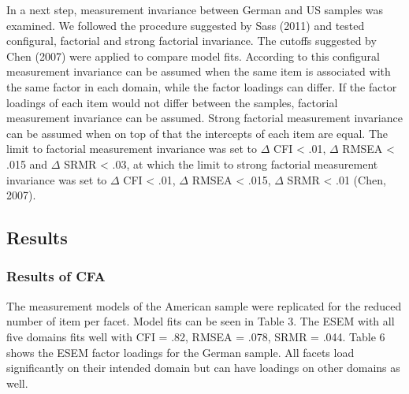 \documentclass[man]{apa6}
\theoremstyle{definition}
\theoremstyle{definition}
\theoremstyle{definition}
\theoremstyle{remark}
\begin{document}
In a next step, measurement invariance between German and US samples was
examined. We followed the procedure suggested by Sass (2011) and tested
configural, factorial and strong factorial invariance. The cutoffs
suggested by Chen (2007) were applied to compare model fits. According
to this configural measurement invariance can be assumed when the same
item is associated with the same factor in each domain, while the factor
loadings can differ. If the factor loadings of each item would not
differ between the samples, factorial measurement invariance can be
assumed. Strong factorial measurement invariance can be assumed when on
top of that the intercepts of each item are equal. The limit to
factorial measurement invariance was set to \(\Delta\) CFI \textless{}
.01, \(\Delta\) RMSEA \textless{} .015 and \(\Delta\) SRMR \textless{}
.03, at which the limit to strong factorial measurement invariance was
set to \(\Delta\) CFI \textless{} .01, \(\Delta\) RMSEA \textless{}
.015, \(\Delta\) SRMR \textless{} .01 (Chen, 2007).

\hypertarget{results-1}{%
\subsection{Results}\label{results-1}}

\hypertarget{results-of-cfa}{%
\subsubsection{Results of CFA}\label{results-of-cfa}}

The measurement models of the American sample were replicated for the
reduced number of item per facet. Model fits can be seen in Table 3. The
ESEM with all five domains fits well with CFI = .82, RMSEA = .078, SRMR
= .044. Table 6 shows the ESEM factor loadings for the German sample.
All facets load significantly on their intended domain but can have
loadings on other domains as well.
\end{document}
